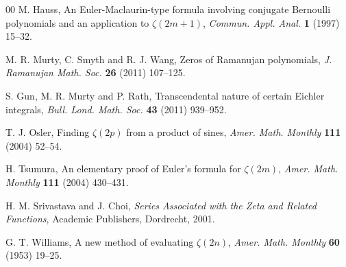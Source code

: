 \documentclass[10pt,reqno]{amsart}
\theoremstyle{remark}
\begin{document}
\begin{thebibliography}{00}
{M. Hauss}, 
An Euler-Maclaurin-type formula involving conjugate Bernoulli polynomials and an application to $\zeta(2m+1)$,
\textit{Commun. Appl. Anal.}
\textbf{1} (1997) 15--32.

{M. R. Murty, C. Smyth and R. J. Wang}, 
Zeros of Ramanujan polynomials,
\textit{J. Ramanujan Math. Soc.}
\textbf{26} (2011) 107--125.

{S. Gun, M. R. Murty and P. Rath}, 
Transcendental nature of certain Eichler integrals, 
\textit{Bull. Lond. Math. Soc.}
\textbf{43} (2011) 939--952.

{T. J. Osler},
Finding $\zeta(2p)$ from a product of sines, 
\textit{Amer. Math. Monthly}
\textbf{111} (2004) 52--54.

{H. Tsumura}, 
An elementary proof of Euler's formula for $\zeta(2m)$, 
\textit{Amer. Math. Monthly}
\textbf{111} (2004) 430--431.

{H. M. Srivastava and J. Choi},
\textit{Series Associated with the Zeta and Related Functions},
Academic Publishers, Dordrecht, 2001.

{G. T. Williams}, 
A new method of evaluating $\zeta(2n)$, 
\textit{Amer. Math. Monthly}
\textbf{60} (1953) 19--25.

\end{thebibliography}

\end{document}

